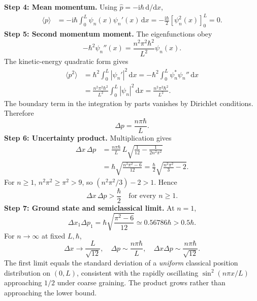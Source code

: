\documentclass[11pt,a4paper]{article}
\newcommand{\dd}{\mathrm{d}}
\newcommand{\iu}{\mathrm{i}}
\newcommand{\abs}[1]{\left|#1\right|}
\begin{document}
\textbf{Step 4: Mean momentum.} Using $\hat p=-\iu\hbar\,\dd/\dd x$,
\begin{align}
\langle p\rangle&=-\iu\hbar\int_0^L\psi_n(x)\psi_n'(x)\,\dd x
=-\frac{\iu\hbar}{2}\left[\psi_n^2(x)\right]_0^L=\boxed{0}.
\end{align}
\textbf{Step 5: Second momentum moment.} The eigenfunctions obey
\begin{equation}
-\hbar^2\psi_n''(x)=\frac{n^2\pi^2\hbar^2}{L^2}\psi_n(x).
\end{equation}
The kinetic-energy quadratic form gives
\begin{align}
\langle p^2\rangle&=\hbar^2\int_0^L\abs{\psi_n'}^2\,\dd x
=-\hbar^2\int_0^L\psi_n^*\psi_n''\,\dd x\\
&=\frac{n^2\pi^2\hbar^2}{L^2}\int_0^L\abs{\psi_n}^2\,\dd x
=\boxed{\frac{n^2\pi^2\hbar^2}{L^2}}.
\end{align}
The boundary term in the integration by parts vanishes by Dirichlet conditions. Therefore
\begin{equation}
\boxed{\Delta p=\frac{n\pi\hbar}{L}.}
\end{equation}
\textbf{Step 6: Uncertainty product.} Multiplication gives
\begin{align}
\Delta x\,\Delta p
&=\frac{n\pi\hbar}{L}\,L\sqrt{\frac1{12}-\frac1{2n^2\pi^2}}\\
&=\hbar\sqrt{\frac{n^2\pi^2-6}{12}}
=\boxed{\frac\hbar2\sqrt{\frac{n^2\pi^2}{3}-2}}.
\end{align}
For $n\geq1$, $n^2\pi^2\geq\pi^2>9$, so $(n^2\pi^2/3)-2>1$. Hence
\begin{equation}\boxed{\Delta x\,\Delta p>\frac\hbar2\quad\text{for every }n\geq1.}\end{equation}
\textbf{Step 7: Ground state and semiclassical limit.} At $n=1$,
\begin{equation}
\Delta x_1\Delta p_1=\hbar\sqrt{\frac{\pi^2-6}{12}}\simeq0.56786\hbar>0.5\hbar.
\end{equation}
For $n\to\infty$ at fixed $L,\hbar$,
\begin{equation}
\Delta x\longrightarrow\frac{L}{\sqrt{12}},\quad \Delta p\sim\frac{n\pi\hbar}{L},\quad
\Delta x\Delta p\sim\frac{n\pi\hbar}{\sqrt{12}}.
\end{equation}
The first limit equals the standard deviation of a \emph{uniform} classical position distribution on $(0,L)$, consistent with the rapidly oscillating $\sin^2(n\pi x/L)$ approaching $1/2$ under coarse graining. The product grows rather than approaching the lower bound.
\end{document}
